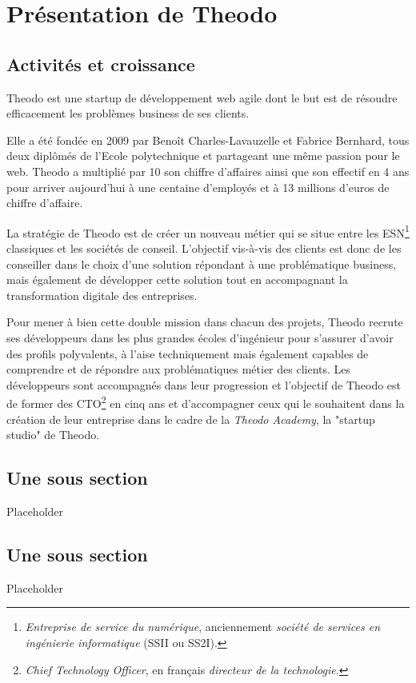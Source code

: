 \section{Présentation de Theodo}

\subsection{Activités et croissance}

Theodo est une startup de développement web agile dont le but est de résoudre efficacement les problèmes \foreignlanguage{english}{business} de ses clients.

Elle a été fondée en 2009 par Benoît Charles-Lavauzelle et Fabrice Bernhard, tous deux diplômés de l'Ecole polytechnique et partageant une même passion pour le web. Theodo a multiplié par 10 son chiffre d'affaires ainsi que son effectif en 4 ans pour arriver aujourd'hui à une centaine d'employés et à 13 millions d'euros de chiffre d'affaire.

La stratégie de Theodo est de créer un nouveau métier qui se situe entre les ESN\footnote{\textit{Entreprise de service du numérique}, anciennement \textit{société de services en ingénierie informatique} (SSII ou SS2I).} classiques et les sociétés de conseil. L'objectif vis-à-vis des clients est donc de les conseiller dans le choix d'une solution répondant à une problématique business, mais également de développer cette solution tout en accompagnant la transformation digitale des entreprises.

Pour mener à bien cette double mission dans chacun des projets, Theodo recrute ses développeurs dans les plus grandes écoles d'ingénieur pour s'assurer d'avoir des profils polyvalents, à l'aise techniquement mais également capables de comprendre et de répondre aux problématiques métier des clients. Les développeurs sont accompagnés dans leur progression et l'objectif de Theodo est de former des CTO\footnote{\textit{\foreignlanguage{english}{Chief Technology Officer}}, en français \textit{directeur de la technologie}.} en cinq ans et d'accompagner ceux qui le souhaitent dans la création de leur entreprise dans le cadre de la \textit{\foreignlanguage{english}{Theodo Academy}}, la "startup studio" de Theodo.

\subsection{Une sous section}

Placeholder

\subsection{Une sous section}

Placeholder